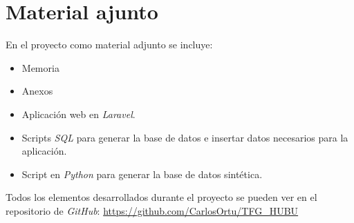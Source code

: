 \section{Material ajunto}

En el proyecto como material adjunto se incluye: 
\begin{itemize}
	\item Memoria
	\item Anexos 
	\item Aplicación web en \textit{Laravel}.
	\item Scripts \textit{SQL} para generar la base de datos e insertar datos necesarios para la aplicación.
	\item Script en \textit{Python} para generar la base de datos sintética.
\end{itemize}

Todos los elementos desarrollados durante el proyecto se pueden ver en el repositorio de \textit{GitHub}: \url{https://github.com/CarlosOrtu/TFG_HUBU}

